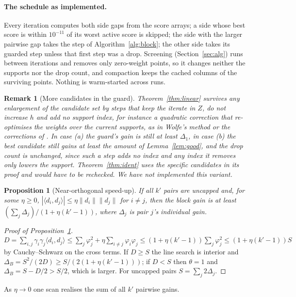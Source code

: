 \documentclass[pdflatex,sn-apa]{sn-jnl}%
\newtheorem{proposition}[theorem]{Proposition}
\newtheorem{remark}[theorem]{Remark}
\theoremstyle{thmstyleone}
\newtheorem{proposition}[theorem]{Proposition}
\theoremstyle{thmstyletwo}
\newtheorem{remark}[theorem]{Remark}
\newcommand{\ip}[2]{\langle #1, #2 \rangle}
\newcommand{\norm}[1]{\lVert #1 \rVert}
\begin{document}
\paragraph{The schedule as implemented.} Every iteration computes both
side gaps from the score arrays; a side whose best score is within
$10^{-11}$ of its worst active score is skipped; the side with the larger
pairwise gap takes the step of Algorithm~\ref{alg:block}; the other side
takes its guarded step unless that first step was a drop. Screening
(Section~\ref{sec:alg}) runs between iterations and removes only zero-weight points, so
it changes neither the supports nor the drop count, and compaction keeps
the cached columns of the surviving points. Nothing is warm-started
across runs.
\begin{remark}[More candidates in the guard]\label{rem:candidates}
Theorem~\ref{thm:linear} survives any enlargement of the candidate set
by steps that keep the iterate in $Z$, do not increase $h$ and add no
support index, for instance a quadratic correction that re-optimises the
weights over the current supports, as in Wolfe's method or the
corrections of \citet{halbey2025}. In case (a) the guard's gain is still
at least $\Delta_1$, in case (b) the best candidate still gains at least
the amount of Lemma~\ref{lem:good}, and the drop count is unchanged,
since such a step adds no index and any index it removes only lowers the
support. Theorem~\ref{thm:ident} uses the specific candidates in its
proof and would have to be rechecked. We have not implemented this
variant.
\end{remark}

\begin{proposition}[Near-orthogonal speed-up]\label{prop:orth}
If all $k'$ pairs are uncapped and, for some $\eta\ge0$,
$|\ip{d_i}{d_j}|\le\eta\norm{d_i}\norm{d_j}$ for $i\ne j$, then the
block gain is at least $(\sum_j\Delta_j)/(1+\eta(k'-1))$, where
$\Delta_j$ is pair $j$'s individual gain.
\end{proposition}
\begin{proof}[Proof of Proposition~\ref{prop:orth}]
$D=\sum_{i,j}\gamma_i\gamma_j\ip{d_i}{d_j}\le\sum_j\varphi_j^2+\eta\sum_{i\ne j}\varphi_i\varphi_j\le(1+\eta(k'-1))\sum_j\varphi_j^2\le(1+\eta(k'-1))S$
by Cauchy--Schwarz on the cross terms. If $D\ge S$ the line search is
interior and $\Delta_B=S^2/(2D)\ge S/(2(1+\eta(k'-1)))$; if $D<S$ then
$\theta=1$ and $\Delta_B=S-D/2>S/2$, which is larger. For uncapped pairs
$S=\sum_j2\Delta_j$.
\end{proof}
As $\eta\to0$ one scan realises the sum of all $k'$ pairwise gains.
\end{document}
